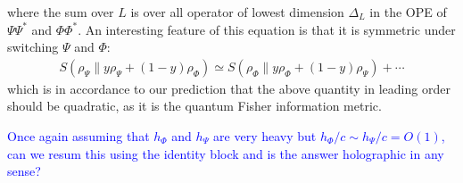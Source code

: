 \documentclass[11pt]{article}
\newcommand{\lb}{\left(}
\newcommand{\rb}{\right)}
\newcommand{\NL}[1]{\textcolor{blue}{#1}}
\begin{document}
where the sum over $L$ is over all operator of lowest dimension $\Delta_L$ in the OPE of $\Psi\Psi^*$ and $\Phi \Phi^*$.
An interesting feature of this equation is that it is symmetric under switching $\Psi$ and $\Phi$:
\begin{align}
S(\rho_\Psi\|y\rho_\Psi+(1-y)\rho_\Phi)\simeq S(\rho_\Phi\|y\rho_\Phi+(1-y)\rho_\Psi) + \cdots
\end{align}
which is in accordance to our prediction that the above quantity in leading order should be quadratic, as it is the quantum Fisher information metric. 


\NL{Once again assuming that $h_\Phi$ and $h_\Psi$ are very heavy but $h_\Phi/c\sim h_\Psi/c=O(1)$, can we resum this using the identity block and is the answer holographic in any sense?}
\end{document}
